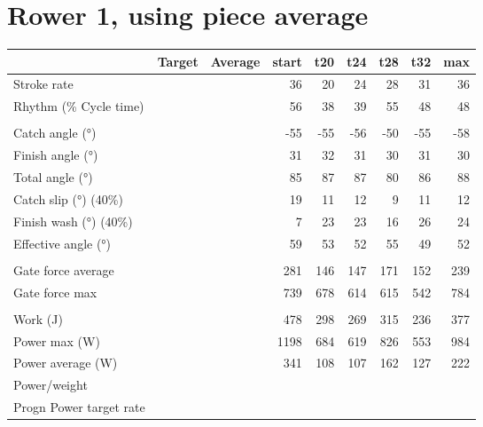 \documentclass[12pt]{article}%
\begin{document}
\section*{Rower 1, using piece average}%
\label{sec:Rower1,usingpieceaverage}%
\begin{tabular}{l|rrrrrrrr|}%
\hline%
&Target&Average&start&t20&t24&t28&t32&max\\%
\hline%
Stroke rate&&&36&20&24&28&31&36\\%
Rhythm (\% Cycle time)&&&56&38&39&55&48&48\\%
&&&&&&&&\\%
Catch angle (°)&&&{-}55&{-}55&{-}56&{-}50&{-}55&{-}58\\%
Finish angle (°)&&&31&32&31&30&31&30\\%
Total angle (°)&&&85&87&87&80&86&88\\%
Catch slip (°)  (40\%)&&&19&11&12&9&11&12\\%
Finish wash (°)  (40\%)&&&7&23&23&16&26&24\\%
Effective angle (°)&&&59&53&52&55&49&52\\%
&&&&&&&&\\%
Gate force average&&&281&146&147&171&152&239\\%
Gate force max&&&739&678&614&615&542&784\\%
&&&&&&&&\\%
Work (J)&&&478&298&269&315&236&377\\%
Power max (W)&&&1198&684&619&826&553&984\\%
Power average (W)&&&341&108&107&162&127&222\\%
Power/weight&&&&&&&&\\%
Progn Power target rate&&&&&&&&\\%
\hline%
\end{tabular}%
\newline%
%
\newpage

%
\end{document}
